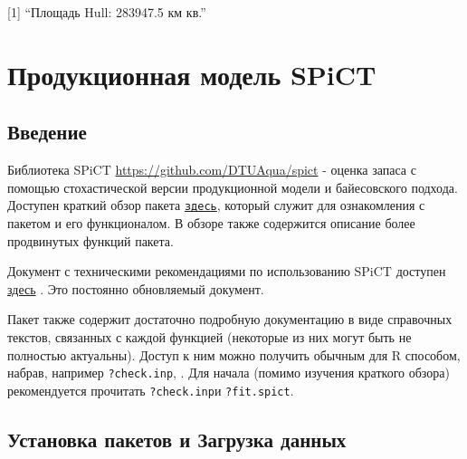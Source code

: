 \documentclass[
  letterpaper,
  DIV=11,
  numbers=noendperiod]{scrreprt}
\begin{document}
{[}1{]} ``Площадь Hull: 283947.5 км кв.''


\chapter{Продукционная модель
SPiCT}\label{ux43fux440ux43eux434ux443ux43aux446ux438ux43eux43dux43dux430ux44f-ux43cux43eux434ux435ux43bux44c-spict}

\section{Введение}\label{ux432ux432ux435ux434ux435ux43dux438ux435-4}

Библиотека SPiCT \url{https://github.com/DTUAqua/spict} - оценка запаса
с помощью стохастической версии продукционной модели и байесовского
подхода. Доступен краткий обзор пакета
\href{https://github.com/DTUAqua/spict/raw/master/spict/inst/doc/spict_handbook.pdf}{\texttt{здесь}},
который служит для ознакомления с пакетом и его функционалом. В обзоре
также содержится описание более продвинутых функций пакета.

Документ с техническими рекомендациями по использованию SPiCT доступен
\href{https://github.com/DTUAqua/spict/raw/master/spict/inst/doc/spict_guidelines.pdf}{здесь}
. Это постоянно обновляемый документ.

Пакет также содержит достаточно подробную документацию в виде справочных
текстов, связанных с каждой функцией (некоторые из них могут быть не
полностью актуальны). Доступ к ним можно получить обычным для R
способом, набрав, например \texttt{?check.inp}, . Для начала (помимо
изучения краткого обзора) рекомендуется прочитать \texttt{?check.inp}и
\texttt{?fit.spict}.

\section{Установка пакетов и Загрузка
данных}\label{ux443ux441ux442ux430ux43dux43eux432ux43aux430-ux43fux430ux43aux435ux442ux43eux432-ux438-ux437ux430ux433ux440ux443ux437ux43aux430-ux434ux430ux43dux43dux44bux445}
\end{document}
